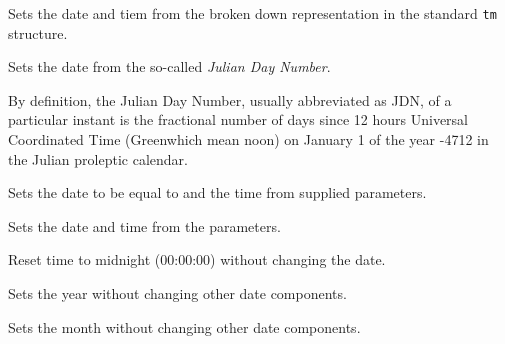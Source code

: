 Sets the date and tiem from the broken down representation in the standard 
{\tt tm} structure.

\label{wxdatetimesetjdn}


Sets the date from the so-called {\it Julian Day Number}.

By definition, the Julian Day Number, usually abbreviated as JDN, of a
particular instant is the fractional number of days since 12 hours Universal
Coordinated Time (Greenwhich mean noon) on January 1 of the year -4712 in the
Julian proleptic calendar.

\label{wxdatetimesettime}


Sets the date to be equal to  and the time
from supplied parameters.

\label{wxdatetimesetdate}


Sets the date and time from the parameters.

\label{wxdatetimeresettime}


Reset time to midnight (00:00:00) without changing the date.

\label{wxdatetimesetyear}


Sets the year without changing other date components.

\label{wxdatetimesetmonth}


Sets the month without changing other date components.

\label{wxdatetimesetday}


